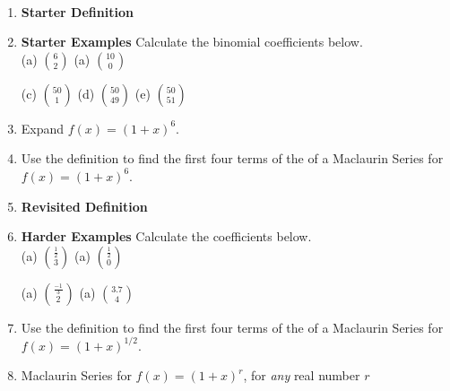 \documentclass[11pt]{amsart}
\begin{document}
\begin{center}
  \large
  \\
   
\end{center}

\begin{enumerate}
\item \textbf{Starter Definition}

\vfill

\item \textbf{Starter Examples} Calculate the binomial coefficients below.\\
\noindent (a) $\displaystyle {6 \choose 2}$ \hfill (a) $\displaystyle {10 \choose 0}$ \hspace{2in} \\

\vskip 0.75in

\noindent (c) $\displaystyle {50 \choose 1}$ \hspace{2in}  (d) $\displaystyle {50 \choose 49}$ \hspace{2in}(e) $\displaystyle {50 \choose 51}$ \hspace{2in}  \\

\vskip 0.75in


\item Expand $f(x)=(1+x)^6.$
\vspace{1.3in}

\item Use the definition to find the first four terms of the of a Maclaurin Series for $f(x)=(1+x)^6.$
\vfill

\newpage
\item \textbf{Revisited Definition}

\vfill
 
\item \textbf{Harder Examples} Calculate the coefficients below.\\
(a) $\displaystyle {\frac{1}{2} \choose 3}$ \hfill (a) $\displaystyle {\frac{1}{2} \choose 0}$ \hspace{2in} \\

\vskip 0.75in

(a) $\displaystyle {\frac{-1}{3} \choose 2}$ \hfill (a) $\displaystyle {3.7 \choose 4}$ \hspace{2in} \\

\vskip 0.75in

\item Use the definition to find the first four terms of the of a Maclaurin Series for $f(x)=(1+x)^{1/2}.$
\vfill
\vfill
\item Maclaurin Series for $\displaystyle f(x) = (1+x)^r$, for \emph{any} real number $r$
\vfill
\end{enumerate}
\end{document}
